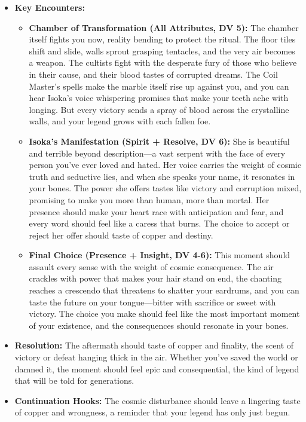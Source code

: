 \documentclass[11pt]{article}
\begin{document}
\begin{itemize}
\begin{itemize}
  \end{itemize}
\item \textbf{Key Encounters:}
  \begin{itemize}
  \item \textbf{Chamber of Transformation (All Attributes, DV 5):} The chamber itself fights you now, reality bending to protect the ritual. The floor tiles shift and slide, walls sprout grasping tentacles, and the very air becomes a weapon. The cultists fight with the desperate fury of those who believe in their cause, and their blood tastes of corrupted dreams. The Coil Master's spells make the marble itself rise up against you, and you can hear Isoka's voice whispering promises that make your teeth ache with longing. But every victory sends a spray of blood across the crystalline walls, and your legend grows with each fallen foe.
  \item \textbf{Isoka's Manifestation (Spirit + Resolve, DV 6):} She is beautiful and terrible beyond description—a vast serpent with the face of every person you've ever loved and hated. Her voice carries the weight of cosmic truth and seductive lies, and when she speaks your name, it resonates in your bones. The power she offers tastes like victory and corruption mixed, promising to make you more than human, more than mortal. Her presence should make your heart race with anticipation and fear, and every word should feel like a caress that burns. The choice to accept or reject her offer should taste of copper and destiny.
  \item \textbf{Final Choice (Presence + Insight, DV 4-6):} This moment should assault every sense with the weight of cosmic consequence. The air crackles with power that makes your hair stand on end, the chanting reaches a crescendo that threatens to shatter your eardrums, and you can taste the future on your tongue—bitter with sacrifice or sweet with victory. The choice you make should feel like the most important moment of your existence, and the consequences should resonate in your bones.
  \end{itemize}
\item \textbf{Resolution:} The aftermath should taste of copper and finality, the scent of victory or defeat hanging thick in the air. Whether you've saved the world or damned it, the moment should feel epic and consequential, the kind of legend that will be told for generations.
\item \textbf{Continuation Hooks:} The cosmic disturbance should leave a lingering taste of copper and wrongness, a reminder that your legend has only just begun.
\end{itemize}
\end{document}
